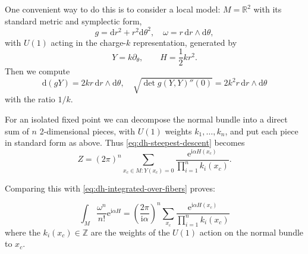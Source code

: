 \documentclass[12pt,letterpaper,reqno]{article}
\numberwithin{equation}{section}
\newcommand{\R}{\ensuremath{\mathbb R}}
\newcommand{\Z}{\ensuremath{\mathbb Z}}
\newcommand{\half}{\ensuremath{\frac{1}{2}}}
\newcommand{\I}{{\mathrm i}}
\newcommand{\e}{{\mathrm e}}
\newcommand{\de}{\mathrm{d}}
\newcommand{\abs}[1]{\lvert#1\rvert}
\DeclareMathOperator{\sgn}{sgn}
\begin{document}
One convenient way to do this is to consider a local model:
$M = \R^2$ with its standard metric and symplectic form,
\begin{equation}
g = \de r^2 + r^2 \de \theta^2, \quad \omega = r \, \de r \wedge \de \theta, 
\end{equation}
with $U(1)$ acting in the charge-$k$ representation,
generated by
\begin{equation}
  Y = k \partial_\theta, \qquad H = \half k r^2.
\end{equation}
Then we compute
\begin{equation}
  \de (gY) = 2 k r \, \de r \wedge \de \theta, \quad \sqrt{\det g(Y,Y)''(0)} = 2 k^2 r \, \de r \wedge \de \theta
\end{equation}
with the ratio $1/k$.

For an isolated fixed point we can decompose the normal bundle
into a direct sum of $n$ 2-dimensional pieces, with $U(1)$ 
weights $k_1, \dots, k_n$, and put each piece in standard form as
above.
Thus \eqref{eq:dh-steepest-descent} becomes
\begin{equation}
  Z = (2\pi)^n  \sum_{x_c \in M: Y(x_c) = 0} \frac{\e^{\I \alpha H(x_c)}}{\prod_{i=1}^n k_i(x_c)}.
\end{equation}

Comparing this with \eqref{eq:dh-integrated-over-fibers} proves:

\begin{thm} \label{thm:duistermaat-heckman}
\begin{equation} \label{eq:dh-formula}
\int_M \frac{\omega^n}{n!} \e^{\I \alpha H} = \left( \frac{2\pi}{\I \alpha} \right)^{n} \sum_{x_c} \frac{\e^{\I \alpha H(x_c)}}{\prod_{i=1}^n k_i(x_c)}
\end{equation}
where the $k_i(x_c) \in \Z$ are the weights of the $U(1)$ action
on the normal bundle to $x_c$.
\end{thm}
\end{document}
